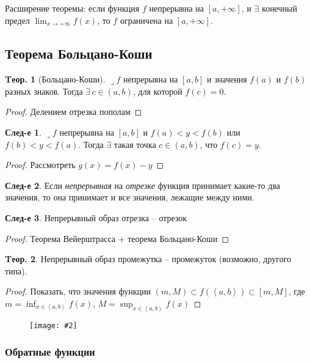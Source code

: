 \documentclass[a4paper,12pt]{article}
\numberwithin{figure}{section}
\theoremstyle{definition}
\theoremstyle{definition}
\newtheorem{theorem}{Tеор.}[section]
\newtheorem*{corollary}{След-е} %
\def\DS{\displaystyle}
\def\intab{\left<a,b\right>}
\def\lets{{\huge$\lrcorner$}\space}
\newcommand\CenterFigure[2]{
	\begin{figure}[H]
		\centering
		\texttt{[image: \#2]}
	\end{figure}
}
\begin{document}
Расширение теоремы: если функция $f$ непрерывна на $[a,+\infty]$,
и $\exists$ конечный предел $\DS \lim_{x\to+\infty}f(x)$,
то $f$ ограничена на $[a,+\infty]$.


\subsection{Теорема Больцано-Коши}

\begin{theorem}[Больцано-Коши]
	\lets $f$ непрерывна на $[a,b]$ и значения $f(a)$ и $f(b)$ разных знаков.
	Тогда $\exists \, c \in (a,b)$, для которой $f(c)=0$.
\end{theorem}
\begin{proof} Делением отрезка пополам \end{proof}

\begin{corollary}
	\lets $f$ непрерывна на $[a,b]$ и $f(a)<y<f(b)$ или $f(b)<y<f(a)$.
	Тогда $\exists$ такая точка $c\in(a,b)$, что $f(c)=y$.
\end{corollary}
\begin{proof} Рассмотреть $g(x)=f(x)-y$ \end{proof}

\begin{corollary}
	Если \textit{непрерывная} на \textit{отрезке} функция принимает какие-то два значения,
	то она принимает и все значения, лежащие между ними.
\end{corollary}
\bigskip

\begin{corollary}Непрерывный образ отрезка -- отрезок\end{corollary}
\begin{proof} Теорема Вейерштрасса + теорема Больцано-Коши \end{proof}
\bigskip

\begin{theorem}
	Непрерывный образ промежутка -- промежуток (возможно, другого типа).
\end{theorem}
\begin{proof}
	Показать, что значения функции $(m,M) \subset f\left(\intab\right) \subset [m,M]$,
	где $\DS m=\inf_{x\in\intab}f(x)$, $\DS M=\sup_{x\in\intab}f(x)$
\end{proof}
\bigskip

\CenterFigure{\linewidth}{bolcano-koshi-test-1.png}

\subsubsection{Обратные функции}
\end{document}
